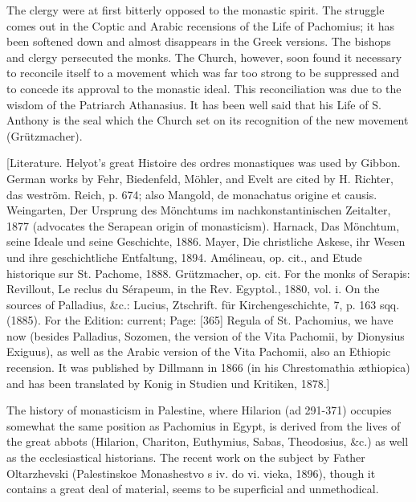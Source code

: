 The clergy were at first bitterly opposed to the monastic spirit. The struggle comes out in the Coptic and Arabic recensions of the Life of Pachomius; it has been softened down and almost disappears in the Greek versions. The bishops and clergy persecuted the monks. The Church, however, soon found it necessary to reconcile itself to a movement which was far too strong to be suppressed and to concede its approval to the monastic ideal. This reconciliation was due to the wisdom of the Patriarch Athanasius. It has been well said that his Life of S. Anthony is the seal which the Church set on its recognition of the new movement (Grützmacher).

[Literature. Helyot\texthebrew{}’s great Histoire des ordres monastiques was used by Gibbon. German works by Fehr, Biedenfeld, Möhler, and Evelt are cited by H. Richter, das weström. Reich, p. 674; also Mangold, de monachatus origine et causis. Weingarten, Der Ursprung des Mönchtums im nachkonstantinischen Zeitalter, 1877 (advocates the Serapean origin of monasticism). Harnack, Das Mönchtum, seine Ideale und seine Geschichte, 1886. Mayer, Die christliche Askese, ihr Wesen und ihre geschichtliche Entfaltung, 1894. Amélineau, op. cit., and Etude historique sur St. Pachome, 1888. Grützmacher, op. cit. For the monks of Serapis: Revillout, Le reclus du Sérapeum, in the Rev. Egyptol., 1880, vol. i. On the sources of Palladius, \&c.: Lucius, Ztschrift. für Kirchengeschichte, 7, p. 163 sqq. (1885). For the Edition: current; Page: [365] Regula of St. Pachomius, we have now (besides Palladius, Sozomen, the version of the Vita Pachomii, by Dionysius Exiguus), as well as the Arabic version of the Vita Pachomii, also an Ethiopic recension. It was published by Dillmann in 1866 (in his Chrestomathia æthiopica) and has been translated by Konig in Studien und Kritiken, 1878.]

The history of monasticism in Palestine, where Hilarion (ad 291-371) occupies somewhat the same position as Pachomius in Egypt, is derived from the lives of the great abbots (Hilarion, Chariton, Euthymius, Sabas, Theodosius, \&c.) as well as the ecclesiastical historians. The recent work on the subject by Father Oltarzhevski (Palestinskoe Monashestvo s iv. do vi. vieka, 1896), though it contains a great deal of material, seems to be superficial and unmethodical.


